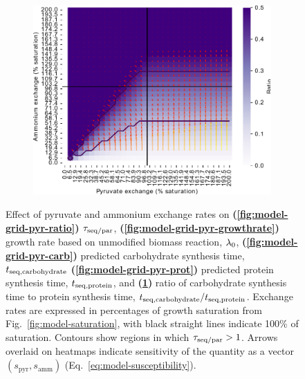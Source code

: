 \begin{figure}
  \begin{subfigure}[t]{0.45\textwidth}
  \centering
    \includegraphics[width=\linewidth]{ec_grid_pyr_amm_carb_to_prot}
    \caption{
    }
    \label{fig:model-grid-pyr-carb-to-prot}
  \end{subfigure}
  \caption[
    Effect of pyruvate and ammonium exchange rates
  ]{
    Effect of pyruvate and ammonium exchange rates on \textbf{(\ref{fig:model-grid-pyr-ratio})} $\tau_{\mathrm{seq}/\mathrm{par}}$, \textbf{(\ref{fig:model-grid-pyr-growthrate})} growth rate based on unmodified biomass reaction, $\lambda_{0}$, \textbf{(\ref{fig:model-grid-pyr-carb})} predicted carbohydrate synthesis time, $t_{\mathrm{seq},\mathrm{carbohydrate}}$ \textbf{(\ref{fig:model-grid-pyr-prot})} predicted protein synthesis time, $t_{\mathrm{seq},\mathrm{protein}}$, and \textbf{(\ref{fig:model-grid-pyr-carb-to-prot})} ratio of carbohydrate synthesis time to protein synthesis time, $t_{\mathrm{seq},\mathrm{carbohydrate}}/t_{\mathrm{seq},\mathrm{protein}}$.
    Exchange rates are expressed in percentages of growth saturation from Fig.\ \ref{fig:model-saturation}, with black straight lines indicate 100\% of saturation.
    Contours show regions in which $\tau_{\mathrm{seq}/\mathrm{par}} > 1$.
    Arrows overlaid on heatmaps indicate sensitivity of the quantity as a vector $(s_{\mathrm{pyr}}, s_{\mathrm{amm}})$ (Eq.\ \ref{eq:model-susceptibility}).
  }
  \label{fig:model-grid-pyr}
\end{figure}

